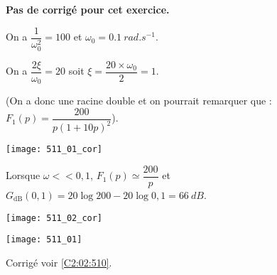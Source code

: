\normaltrue \difficilefalse \tdifficilefalse
\correctionfalse


\setcounter{question}{0}
\ifcorrection
\else
\textbf{Pas de corrigé pour cet exercice.}
\fi


\ifprof 
\else
 \fi
 
\ifprof
On a $\dfrac{1}{\omega_0^2} = {100}$ et $\omega_0 = \SI{0,1}{rad.s^{-1}}$.

On a $\dfrac{2\xi}{\omega_0}= {20}$ soit $\xi = \dfrac{20\times \omega_0}{2 }= 1$.

(On a donc une racine double et on pourrait remarquer que : 
$F_1(p)=\dfrac{200}{p\left(1+10p\right)^2}$).

\begin{center}
\texttt{[image: 511\_01\_cor]}
\end{center}

Lorsque $\omega << 0,1$, $F_1(p) \simeq \dfrac{200}{p}$ et $G_{\text{dB}}(0,1) = 20\log 200 - 20 \log 0,1 = \SI{66}{dB}$.
\begin{center}
\texttt{[image: 511\_02\_cor]}
\end{center}

\else 
\begin{center}
\texttt{[image: 511\_01]}
\end{center}
\fi






 

\ifprof
\else
\begin{flushright}
\footnotesize{Corrigé  voir \ref{C2:02:510}.}
\end{flushright}%
\fi